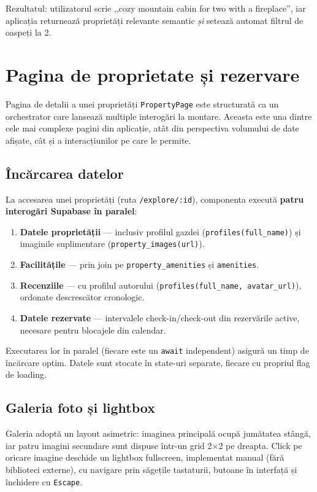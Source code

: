 \documentclass[12pt,a4paper,oneside]{report}
\begin{document}
Rezultatul: utilizatorul scrie ,,cozy mountain cabin for two with a fireplace'', iar aplicația returnează proprietăți relevante semantic \textit{și} setează automat filtrul de oaspeți la 2.


\section{Pagina de proprietate și rezervare}

Pagina de detalii a unei proprietăți \texttt{PropertyPage} este structurată ca un orchestrator care lansează multiple interogări la montare. Aceasta este una dintre cele mai complexe pagini din aplicație, atât din perspectiva volumului de date afișate, cât și a interacțiunilor pe care le permite.

\subsection{Încărcarea datelor}

La accesarea unei proprietăți (ruta \texttt{/explore/:id}), componenta execută \textbf{patru interogări Supabase în paralel}:

\begin{enumerate}
  \item \textbf{Datele proprietății} — inclusiv profilul gazdei (\texttt{profiles(full\_name)}) și imaginile suplimentare (\texttt{property\_images(url)}).
  \item \textbf{Facilitățile} — prin join pe \texttt{property\_amenities} și \texttt{amenities}.
  \item \textbf{Recenziile} — cu profilul autorului (\texttt{profiles(full\_name, avatar\_url)}), ordonate descrescător cronologic.
  \item \textbf{Datele rezervate} — intervalele check-in/check-out din rezervările active, necesare pentru blocajele din calendar.
\end{enumerate}

Executarea lor în paralel (fiecare este un \texttt{await} independent) asigură un timp de încărcare optim. Datele sunt stocate în state-uri separate, fiecare cu propriul flag de loading.

\subsection{Galeria foto și lightbox}

Galeria adoptă un layout asimetric: imaginea principală ocupă jumătatea stângă, iar patru imagini secundare sunt dispuse într-un grid 2$\times$2 pe dreapta. Click pe oricare imagine deschide un lightbox fullscreen, implementat manual (fără biblioteci externe), cu navigare prin săgețile tastaturii, butoane în interfață și închidere cu \texttt{Escape}.
\end{document}
